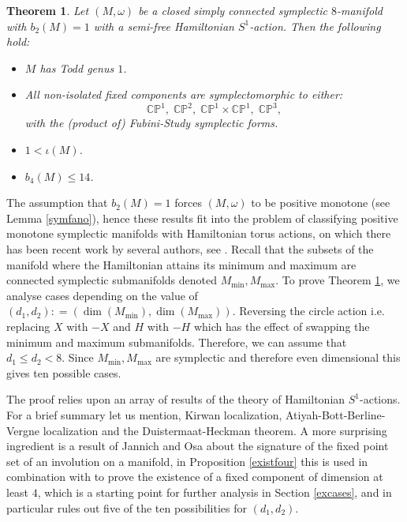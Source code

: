 \documentclass[12pt]{article}
\newtheorem{mainthm}{Theorem}
\begin{document}
\begin{mainthm}  \label{thm:mainA} 
Let $(M,\omega)$ be a closed simply connected symplectic $8$-manifold with $b_{2}(M)=1$ with a semi-free Hamiltonian $S^1$-action. Then the following hold:

\begin{itemize}
\item[a).] $M$ has Todd genus $1$.
\item[b).] All non-isolated fixed  components are symplectomorphic to either: $$ \mathbb{CP}^1,\;\mathbb{CP}^2, \; \mathbb{CP}^1 \times \mathbb{CP}^1,\; \mathbb{CP}^3,$$ with the (product of) Fubini-Study symplectic forms.

\item[c).] $1 < \iota(M)$.

\item[d).] $b_{4}(M) \leq 14$.
\end{itemize}
\end{mainthm}

The assumption that $b_{2}(M)=1$ forces $(M,\omega)$ to be positive monotone (see Lemma \ref{symfano}), hence these results fit into the problem of classifying positive monotone symplectic manifolds with Hamiltonian torus actions, on which there has been recent work by several authors, see \cite{Ch,LP1,SS,CK3}. Recall that the subsets of the manifold where the Hamiltonian attains its minimum and maximum are connected symplectic submanifolds denoted $M_{\min},M_{\max}$. To prove Theorem \ref{thm:mainA}, we analyse cases depending on the value of $(d_{1},d_{2}): = (\dim(M_{\min}),\dim(M_{\max}))$. Reversing the circle action i.e. replacing $X$ with $-X$ and $H$ with $-H$ which has the effect of swapping the minimum and maximum submanifolds. Therefore, we can assume that $d_1 \leq d_2 < 8.$ Since $M_{\min},M_{\max}$ are symplectic and therefore even dimensional this gives ten possible cases.

The proof relies upon an array of results of the theory of Hamiltonian $S^1$-actions. For a brief summary let us mention, Kirwan localization, Atiyah-Bott-Berline-Vergne localization and the Duistermaat-Heckman theorem. A more surprising ingredient is a result of Jannich and Osa about the signature of the fixed point set of an involution on a manifold, in Proposition \ref{existfour} this is used in combination with  \cite[Theorem 3.4]{L} to prove the existence of a fixed component of dimension at least $4$, which is a starting point for further analysis in Section \ref{excases}, and in particular rules out five of the ten possibilities for $(d_1,d_2)$.
\end{document}
